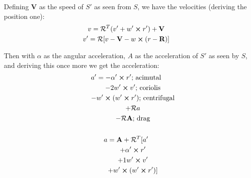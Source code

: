 \documentclass[a4paper,landscape,10pt]{cheatsheet}
\begin{document}
Defining $\textbf{V}$ as the speed of $S'$ as seen from $S$, we have the velocities (deriving the position one):
\begin{gather*}
  v=\mathcal{R}^T(v'+w'\cross r') + \textbf{V} \\
  v'=\mathcal{R}[v-\textbf{V}-w\cross(r-\textbf{R})]
\end{gather*}

Then with $\alpha$ as the angular acceleration, $A$ as the acceleration of $S'$ as seen by $S$, and deriving this once more we get the acceleration:
\begin{gather*}
  a' = -\alpha'\cross r' \text{; acimutal}\\
  \quad\quad - 2w'\cross v' \text{; coriolis}\\
  \quad\quad - w'\cross (w'\cross r') \text{; centrifugal}\\
  \quad\quad + \mathcal{R}a \\
  \quad\quad -\mathcal{R}\textbf{A} \text{; drag}\\
  \\
  a = \textbf{A} + \mathcal{R}^T[a' \\
  \quad\quad +\alpha'\cross r' \\
  \quad\quad + 1w'\cross v' \\
  \quad\quad + w'\cross (w'\cross r')] \\
\end{gather*}
\end{document}
